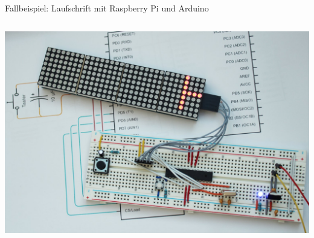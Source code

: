 \begin{frame}{Fallbeispiel: Laufschrift mit Raspberry Pi und Arduino}
\begin{columns}
        \includegraphics[width=\textwidth]{1-grundlagen/img/laufschrift_arduino2}
    \end{columns}
\end{frame}


